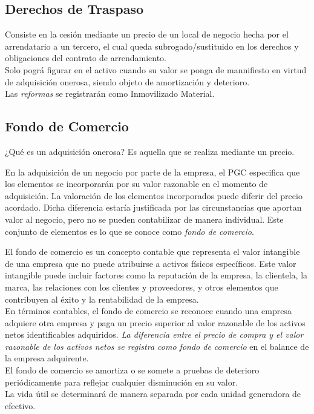 \documentclass[a4paper,12pt]{article}
\begin{document}
\subsection{Derechos de Traspaso}

Consiste en la cesión mediante un precio de un local de negocio hecha por el arrendatario a un tercero, el cual queda subrogado/sustituido en los derechos y obligaciones del contrato de arrendamiento.\\

Solo pográ figurar en el activo cuando su valor se ponga de mannifiesto en virtud de adquisición onerosa, siendo objeto de amortización y deterioro.\\

Las \textit{reformas} se registrarán como Inmovilizado Material.

\subsection{Fondo de Comercio}

\begin{tcolorbox}[colback=green!5!white,colframe=green!75!black, title=Aclaración]
    ¿Qué es un adquisición onerosa? Es aquella que se realiza mediante un precio.
\end{tcolorbox}

En la adquisición de un negocio por parte de la empresa, el PGC especifica que los elementos se incorporarán por su valor razonable en el momento de adquisición. La valoración de los elementos incorporados puede diferir del precio acordado. Dicha diferencia estaría justificada por las circunstancias que aportan valor al negocio, pero no se pueden contabilizar de manera individual. Este conjunto de elementos es lo que se conoce como \textit{fondo de comercio}.\\

\begin{tcolorbox}[colback=yellow!5!white,colframe=yellow!75!black, title=Fondo de Comercio]
    El fondo de comercio es un concepto contable que representa el valor intangible de una empresa que no puede atribuirse a activos físicos específicos. Este valor intangible puede incluir factores como la reputación de la empresa, la clientela, la marca, las relaciones con los clientes y proveedores, y otros elementos que contribuyen al éxito y la rentabilidad de la empresa.\\

    En términos contables, el fondo de comercio se reconoce cuando una empresa adquiere otra empresa y paga un precio superior al valor razonable de los activos netos identificables adquiridos. \textit{La diferencia entre el precio de compra y el valor razonable de los activos netos se registra como fondo de comercio} en el balance de la empresa adquirente.\\

    El fondo de comercio se amortiza o se somete a pruebas de deterioro periódicamente para reflejar cualquier disminución en su valor.\\

    La vida útil se determinará de manera separada por cada unidad generadora de efectivo.
\end{tcolorbox}
\end{document}
